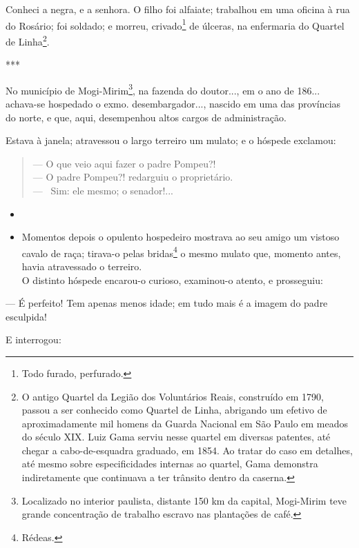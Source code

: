 Conheci a negra, e a senhora. O filho foi alfaiate; trabalhou em uma
oficina à rua do Rosário; foi soldado; e morreu, crivado\footnote{Todo
  furado, perfurado.} de úlceras, na enfermaria do Quartel de
Linha\footnote{O antigo Quartel da Legião dos Voluntários Reais,
  construído em 1790, passou a ser conhecido como Quartel de Linha,
  abrigando um efetivo de aproximadamente mil homens da Guarda Nacional
  em São Paulo em meados do século XIX. Luiz Gama serviu nesse quartel
  em diversas patentes, até chegar a cabo-de-esquadra graduado, em 1854.
  Ao tratar do caso em detalhes, até mesmo sobre especificidades
  internas ao quartel, Gama demonstra indiretamente que continuava a ter
  trânsito dentro da caserna.}.

***

No município de Mogi-Mirim\footnote{Localizado no interior paulista,
  distante 150 km da capital, Mogi-Mirim teve grande concentração de
  trabalho escravo nas plantações de café.}, na fazenda do doutor..., em
o ano de 186... achava-se hospedado o exmo. desembargador..., nascido em
uma das províncias do norte, e que, aqui, desempenhou altos cargos de
administração.

Estava à janela; atravessou o largo terreiro um mulato; e o hóspede
exclamou:

\begin{quote}
--- O que veio aqui fazer o padre Pompeu?!\\
--- O padre Pompeu?! redarguiu o proprietário.\\
--- ~Sim: ele mesmo; o senador!...
\end{quote}

\begin{itemize}
\item
\item
  Momentos depois o opulento hospedeiro mostrava ao seu amigo um vistoso
  cavalo de raça; tirava-o pelas bridas\footnote{Rédeas.} o mesmo
  mulato que, momento antes, havia atravessado o terreiro.\\
  O distinto hóspede encarou-o curioso, examinou-o atento, e prosseguiu:
\end{itemize}

--- É perfeito! Tem apenas menos idade; em tudo mais é a imagem do
padre esculpida!

E interrogou:

